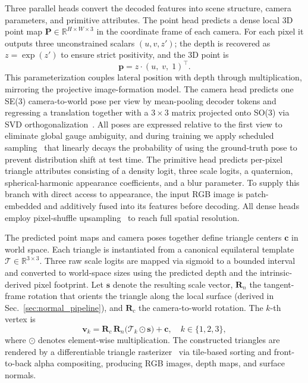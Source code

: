 \documentclass{llmxive}
\begin{document}
Three parallel heads convert the decoded features into scene structure, camera parameters, and primitive attributes. The point head predicts a dense local 3D point map $\mathbf{P}\!\in\!\mathbb{R}^{H\times W\times 3}$ in the coordinate frame of each camera. For each pixel it outputs three unconstrained scalars $(u, v, z')$; the depth is recovered as $z = \exp(z')$ to ensure strict positivity, and the 3D point is
\begin{equation}
    \mathbf{p} = z \cdot (u,\; v,\; 1)^\top.
    \label{eq:point}
\end{equation}
This parameterization couples lateral position with depth through multiplication, mirroring the projective image-formation model. The camera head predicts one SE(3) camera-to-world pose per view by mean-pooling decoder tokens and regressing a translation together with a $3\!\times\!3$ matrix projected onto SO(3) via SVD orthogonalization~\citep{levinson2020analysis}. All poses are expressed relative to the first view to eliminate global gauge ambiguity, and during training we apply scheduled sampling~\citep{bengio2015scheduled} that linearly decays the probability of using the ground-truth pose to prevent distribution shift at test time. The primitive head predicts per-pixel triangle attributes consisting of a density logit, three scale logits, a quaternion, spherical-harmonic appearance coefficients, and a blur parameter. To supply this branch with direct access to appearance, the input RGB image is patch-embedded and additively fused into its features before decoding. All dense heads employ pixel-shuffle upsampling~\citep{shi2016real} to reach full spatial resolution.

The predicted point maps and camera poses together define triangle centers $\mathbf{c}$ in world space. Each triangle is instantiated from a canonical equilateral template $\mathcal{T}\!\in\!\mathbb{R}^{3\times 3}$. Three raw scale logits are mapped via sigmoid to a bounded interval and converted to world-space sizes using the predicted depth and the intrinsic-derived pixel footprint. Let $\mathbf{s}$ denote the resulting scale vector, $\mathbf{R}_n$ the tangent-frame rotation that orients the triangle along the local surface (derived in Sec.~\ref{sec:normal_pipeline}), and $\mathbf{R}_c$ the camera-to-world rotation. The $k$-th vertex is
\begin{equation}
    \mathbf{v}_k = \mathbf{R}_c \, \mathbf{R}_n \bigl(\mathcal{T}_k \odot \mathbf{s}\bigr) + \mathbf{c}, \quad k \in \{1, 2, 3\},
    \label{eq:vertex}
\end{equation}
where $\odot$ denotes element-wise multiplication. The constructed triangles are rendered by a differentiable triangle rasterizer~\citep{Held2025Triangle} via tile-based sorting and front-to-back alpha compositing, producing RGB images, depth maps, and surface normals.
\end{document}
